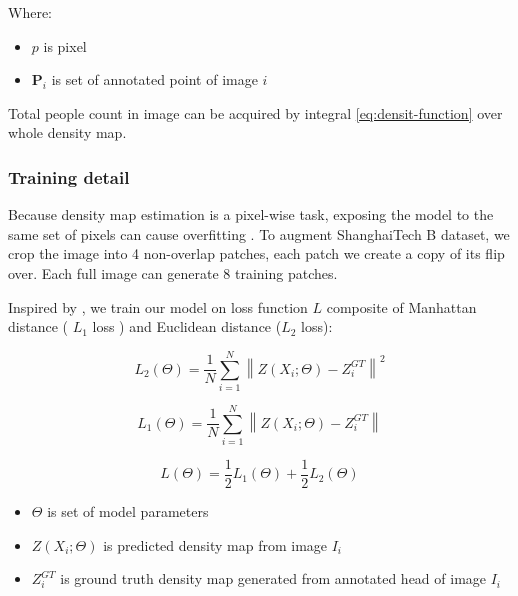 Where: 
\begin{itemize}
  \item $p$ is pixel
  \item $\mathbf{P}_{i}$ is set of annotated point of image $i$
\end{itemize}

Total people count in image can be acquired by integral \eqref{eq:densit-function}  over whole density map.





\subsubsection{Training detail} \hfill

 Because density map estimation is a pixel-wise task, exposing the model to the same set of pixels can cause overfitting \cite{marsden2016fully}. To augment ShanghaiTech B dataset, we crop the image into 4 non-overlap patches, each patch we create a copy of its flip over. Each full image can generate 8 training patches. 

Inspired by \cite{zhang2019crowd}, we train our model on loss function $L$ composite of Manhattan distance ( $L_1$ loss ) and Euclidean distance ($L_2$ loss): 

\begin{equation}L_2(\Theta)=\frac{1}{N} \sum_{i=1}^{N}\left\|Z\left(X_{i} ; \Theta\right)-Z_{i}^{G T}\right\|^{2}\end{equation}

\begin{equation}L_1(\Theta)=\frac{1}{N} \sum_{i=1}^{N}\left\|Z\left(X_{i} ; \Theta\right)-Z_{i}^{G T}\right\|\end{equation}

\begin{equation}
    L(\Theta) = \frac{1}{2}L_1(\Theta) + \frac{1}{2}L_2(\Theta)
\end{equation}

\begin{itemize}
  \item $\Theta$ is set of model parameters
  \item $Z\left(X_{i} ; \Theta\right)$ is predicted density map from image $I_i$
  \item $Z_{i}^{G T}$ is ground truth density map generated from annotated head of image $I_i$
\end{itemize}

